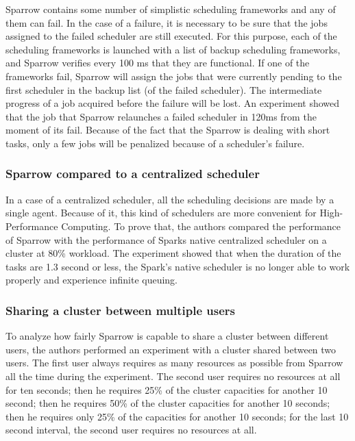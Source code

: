 \documentclass[11pt]{article}
\begin{document}
        	Sparrow contains some number of simplistic scheduling frameworks and any of them can fail. In the case of a failure, it is necessary to be sure that the jobs assigned to the failed scheduler are still executed. For this purpose, each of the scheduling frameworks is launched with a list of backup scheduling frameworks, and Sparrow verifies every 100 ms that they are functional. If one of the frameworks fail, Sparrow will assign the jobs that were currently pending to the first scheduler in the backup list (of the failed scheduler). The intermediate progress of a job acquired before the failure will be lost. An experiment showed that the job that Sparrow relaunches a failed scheduler in 120ms from the moment of its fail. Because of the fact that the Sparrow is dealing with short tasks, only a few jobs will be penalized because of a scheduler's failure.
        
        
        \subsubsection*{Sparrow compared to a centralized scheduler}
        
        	In a case of a centralized scheduler, all the scheduling decisions are made by a single agent. Because of it, this kind of schedulers are more convenient for High-Performance Computing. To prove that, the authors compared the performance of Sparrow with the performance of Sparks native centralized scheduler on a cluster at 80\% workload. The experiment showed that when the duration of the tasks are 1.3 second or less, the Spark's native scheduler is no longer able to work properly and experience infinite queuing.
        
        
        \subsubsection*{Sharing a cluster between multiple users}
        
        	To analyze how fairly Sparrow is capable to share a cluster between different users, the authors performed an experiment with a cluster shared between two users. The first user always requires as many resources as possible from Sparrow all the time during the experiment. The second user requires no resources at all for ten seconds; then he requires 25\% of the cluster capacities for another 10 second; then he requires 50\% of the cluster capacities for another 10 seconds; then he requires only 25\% of the capacities for another 10 seconds; for the last 10 second interval, the second user requires no resources at all.
            
\end{document}

